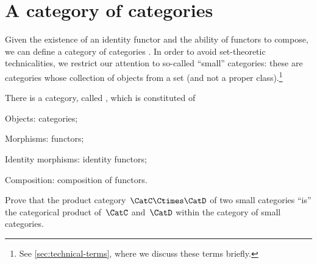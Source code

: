 
\section{A category of categories}

Given the existence of an identity functor and the ability of functors to compose, we can define a category of categories \Category.
In order to avoid set-theoretic technicalities, we restrict our attention to so-called ``small'' categories: these are categories whose collection of objects from a set (and not a proper class).\footnote{See \cref{sec:technical-terms}, where we discuss these terms briefly.}

\begin{ctdefinition}
    \label{def:Category}
    There is a category, called \Category, which is constituted of
    \begin{compactitem}
        \item Objects: categories;
        \item Morphisms: functors;
        \item Identity morphisms: identity functors;
        \item Composition: composition of functors.
    \end{compactitem}
\end{ctdefinition}

\begin{gradedexercise}
    Prove that the product category~$\CatC \Ctimes \CatD$ of two small categories ``is'' the categorical product of~$\CatC$ and~$\CatD$ within the category of small categories.
\end{gradedexercise}


